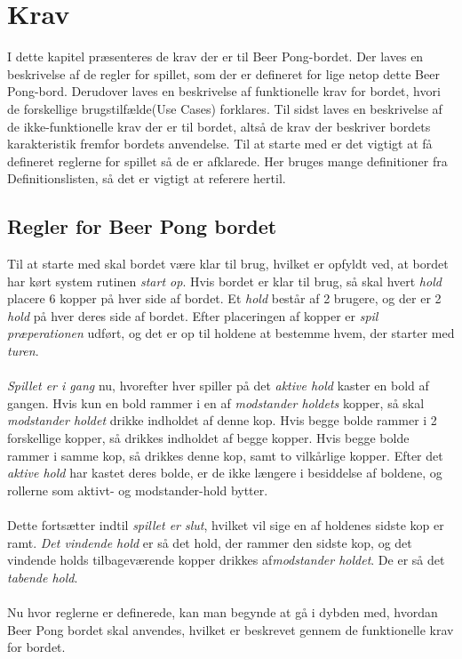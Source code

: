 \documentclass[Rapport/Rapport_main.tex]{subfiles}
\begin{document}
\section{Krav}
I dette kapitel præsenteres de krav der er til Beer Pong-bordet. Der laves en beskrivelse af de regler for spillet, som der er defineret for lige netop dette Beer Pong-bord. Derudover laves en beskrivelse af funktionelle krav for bordet, hvori de forskellige brugstilfælde(Use Cases) forklares. Til sidst laves en beskrivelse af de ikke-funktionelle krav der er til bordet, altså de krav der beskriver bordets karakteristik fremfor bordets anvendelse. Til at starte med er det vigtigt at få defineret reglerne for spillet så de er afklarede. Her bruges mange definitioner fra Definitionslisten, så det er vigtigt at referere hertil.
\subsection{Regler for Beer Pong bordet}
Til at starte med skal bordet være klar til brug, hvilket er opfyldt ved, at bordet har kørt system rutinen \textit{start op}. Hvis bordet er klar til brug, så skal hvert \textit{hold} placere 6 kopper på hver side af bordet. Et \textit{hold} består af 2 brugere, og der er 2 \textit{hold} på hver deres side af bordet. Efter placeringen af kopper er \textit{spil præperationen} udført, og det er op til holdene at bestemme hvem, der starter med \textit{turen}.\\\\
\textit{Spillet er i gang} nu, hvorefter hver spiller på det \textit{aktive hold} kaster en bold af gangen. Hvis kun en bold rammer i en af \textit{modstander holdets} kopper, så skal \textit{modstander holdet} drikke indholdet af denne kop. Hvis begge bolde rammer i 2 forskellige kopper, så drikkes indholdet af begge kopper. Hvis begge bolde rammer i samme kop, så drikkes denne kop, samt to vilkårlige kopper. Efter det \textit{aktive hold} har kastet deres bolde, er de ikke længere i besiddelse af boldene, og rollerne som aktivt- og modstander-hold bytter.\\\\
Dette fortsætter indtil \textit{spillet er slut}, hvilket vil sige en af holdenes sidste kop er ramt. \textit{Det vindende hold} er så det hold, der rammer den sidste kop, og det vindende holds tilbageværende kopper drikkes af\textit{modstander holdet}. De er så det \textit{tabende hold}.\\\\
Nu hvor reglerne er definerede, kan man begynde at gå i dybden med, hvordan Beer Pong bordet skal anvendes, hvilket er beskrevet gennem de funktionelle krav for bordet.
\end{document}
